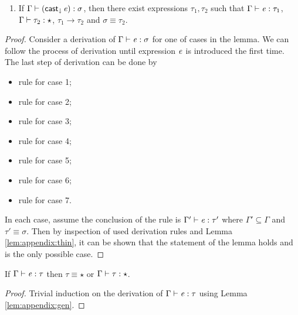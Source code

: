 \begin{lem}
\begin{enumerate}[(1)]
	\item If $\Gamma  \vdash  (  \mathsf{cast}_{\downarrow} \, \mathit{e}  )  :  \sigma$, then there exist expressions $\tau_{{\mathrm{1}}},\tau_{{\mathrm{2}}}$ such that $\Gamma  \vdash  \mathit{e}  :  \tau_{{\mathrm{1}}}$, $\Gamma  \vdash  \tau_{{\mathrm{2}}}  :  \star$, $\tau_{{\mathrm{1}}}  \longrightarrow  \tau_{{\mathrm{2}}}$ and $\sigma  \equiv  \tau_{{\mathrm{2}}}$.
\end{enumerate}
\end{lem}

\begin{proof}
    Consider a derivation of $\Gamma  \vdash  \mathit{e}  :  \sigma$ for one of cases in the lemma. We can follow the process of derivation until expression $\mathit{e}$ is introduced the first time. The last step of derivation can be done by
    \begin{itemize}
        \item rule  for case 1;
        \item rule  for case 2;
        \item rule  for case 3;
        \item rule  for case 4;
        \item rule  for case 5;
        \item rule  for case 6;
        \item rule  for case 7.
    \end{itemize}
    In each case, assume the conclusion of the rule is $\Gamma'  \vdash  \mathit{e}  :  \tau'$ where $\Gamma' \subseteq \Gamma$ and $\tau'  \equiv  \sigma$. Then by inspection of used derivation rules and Lemma \ref{lem:appendix:thin}, it can be shown that the statement of the lemma holds and is the only possible case.
\end{proof}

\begin{lem}\label{lem:appendix:corrtyp}
    If $\Gamma  \vdash  \mathit{e}  :  \tau$ then $\tau  \equiv  \star$ or $\Gamma  \vdash  \tau  :  \star$.
\end{lem}

\begin{proof}
    Trivial induction on the derivation of $\Gamma  \vdash  \mathit{e}  :  \tau$ using Lemma \ref{lem:appendix:gen}.
\end{proof}

